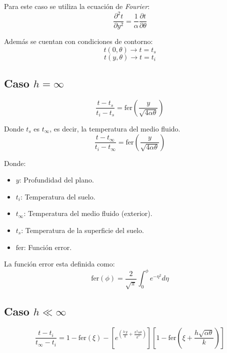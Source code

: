 Para este caso se utiliza la ecuación de \emph{Fourier}:
\begin{equation*}
    \frac{\partial^2 t}{\partial y^2} =
    \frac{1}{\alpha}\frac{\partial t}{\partial\theta}
\end{equation*}

Además se cuentan con condiciones de contorno:
\begin{equation*}
    t(0,\theta)\rightarrow t = t_s
\end{equation*}
\begin{equation*}
    t(y,\theta)\rightarrow t = t_i
\end{equation*}

\subsection{Caso $h=\infty$}
\begin{equation*}
    \frac{t-t_s}{t_i-t_s} = \text{fer}\left(
        \frac{y}{\sqrt{4\alpha\theta}}
    \right)
\end{equation*}

Donde $t_s$ es $t_\infty$, es decir, la temperatura del medio fluido.
\begin{equation}
    \frac{t-t_\infty}{t_i-t_\infty} = \text{fer}\left(
        \frac{y}{\sqrt{4\alpha\theta}}
    \right)
\end{equation}

Donde:
\begin{itemize}
    \item $y$: Profundidad del plano.
    \item $t_i$: Temperatura del suelo.
    \item $t_\infty$: Temperatura del medio fluido (exterior).
    \item $t_s$: Temperatura de la superficie del suelo.
    \item $\text{fer}$: Función error.
\end{itemize}

La función error esta definida como:
\begin{equation}
    \text{fer}(\phi)=\frac{2}{\sqrt{\pi}}\int_0^{\phi} e^{-\eta^2} d\eta
    \label{error}
\end{equation}

\subsection{Caso $h\ll\infty$}
\begin{equation}
    \frac{t-t_i}{t_\infty-t_i} = 
    1 -
    \text{fer}(\xi) -
    \left[
        e^{\left(
            \frac{h\,y}{k}+\frac{h^2\alpha\theta}{k^2}
        \right)}
    \right]
    \left[
        1 - \text{fer}\left(
            \xi + \frac{h\sqrt{\alpha\theta}}{k}
        \right)
    \right]
\end{equation}

